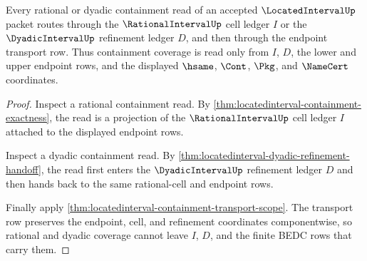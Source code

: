 \begin{theorem}
\label{thm:locatedinterval-rational-cell-coverage-route}
Every rational or dyadic containment read of an accepted $\LocatedIntervalUp$ packet routes through the $\RationalIntervalUp$ cell ledger $I$ or the $\DyadicIntervalUp$ refinement ledger $D$, and then through the endpoint transport row. Thus containment coverage is read only from $I$, $D$, the lower and upper endpoint rows, and the displayed $\hsame$, $\Cont$, $\Pkg$, and $\NameCert$ coordinates.
\end{theorem}
\begin{proof}
Inspect a rational containment read. By \autoref{thm:locatedinterval-containment-exactness}, the read is a projection of the $\RationalIntervalUp$ cell ledger $I$ attached to the displayed endpoint rows.

Inspect a dyadic containment read. By \autoref{thm:locatedinterval-dyadic-refinement-handoff}, the read first enters the $\DyadicIntervalUp$ refinement ledger $D$ and then hands back to the same rational-cell and endpoint rows.

Finally apply \autoref{thm:locatedinterval-containment-transport-scope}. The transport row preserves the endpoint, cell, and refinement coordinates componentwise, so rational and dyadic coverage cannot leave $I$, $D$, and the finite BEDC rows that carry them.
\end{proof}

